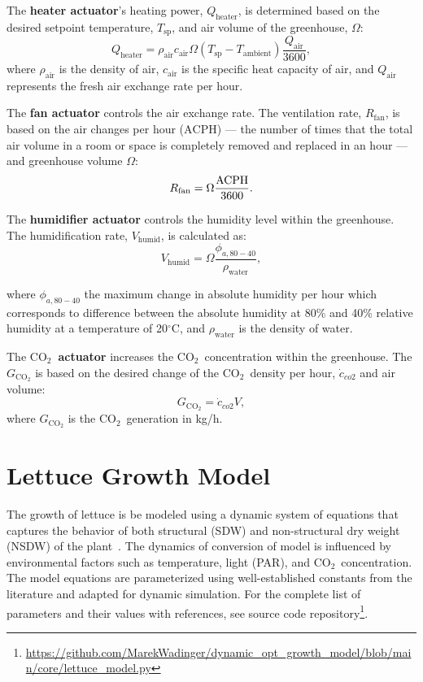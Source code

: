 \documentclass[conference]{IEEEtran}
\newcommand{\coo}{\ensuremath{\mathrm{CO_2}}}
\begin{document}
The \textbf{heater actuator}'s heating power, \( Q_{\text{heater}} \), is determined based on the desired setpoint temperature, \( T_{\text{sp}} \), and air volume of the greenhouse, \( \Omega \):
\begin{equation}
    Q_{\text{heater}} = \rho_{\text{air}}  c_{\text{air}}  \Omega  (T_{\text{sp}} - T_{\text{ambient}})  \frac{Q_{\text{air}}}{3600},
\end{equation}
where \( \rho_{\text{air}} \) is the density of air, \( c_{\text{air}} \) is the specific heat capacity of air, and \( Q_{\text{air}} \) represents the fresh air exchange rate per hour.

The \textbf{fan actuator} controls the air exchange rate. The ventilation rate, \( R_{\text{fan}} \), is based on the air changes per hour (\( \text{ACPH} \)) --- the number of times that the total air volume in a room or space is completely removed and replaced in an hour --- and greenhouse volume \( \Omega \):
\begin{equation}
    R_{\text{fan}} = \Omega \frac{\text{\( \text{ACPH} \)}}{3600}.
\end{equation}

The \textbf{humidifier actuator} controls the humidity level within the greenhouse. The humidification rate, \( V_{\text{humid}} \), is calculated as:
\begin{equation}
    V_{\text{humid}} = \Omega \frac{\phi_{a, 80 - 40}}{\rho_{\text{water}}},
\end{equation}

where \( \phi_{a, 80 - 40} \) the maximum change in absolute humidity per hour which corresponds to difference between the absolute humidity at 80\% and 40\% relative humidity at a temperature of 20\( ^\circ \)C, and \( \rho_{\text{water}} \) is the density of water.

The \textbf{\coo\ actuator} increases the \coo\ concentration within the greenhouse. The \( G_{\coo} \) is based on the desired change of the \coo\ density per hour, \( \dot{c}_{co2} \) and air volume:
\begin{equation}
    G_{\coo} = \dot{c}_{co2}  V,
\end{equation}
where \( G_{\coo} \) is the \coo\ generation in kg/h.


\section{Lettuce Growth Model}\label{sec:lettuce_growth}
The growth of lettuce is be modeled using a dynamic system of equations that captures the behavior of both structural (SDW) and non-structural dry weight (NSDW) of the plant~\cite{VANHENTEN199455}. The dynamics of conversion of  model is influenced by environmental factors such as temperature, light (PAR), and \coo\ concentration. The model equations are parameterized using well-established constants from the literature and adapted for dynamic simulation. For the complete list of parameters and their values with references, see source code repository\footnote{\url{https://github.com/MarekWadinger/dynamic_opt_growth_model/blob/main/core/lettuce_model.py}}.
\end{document}
